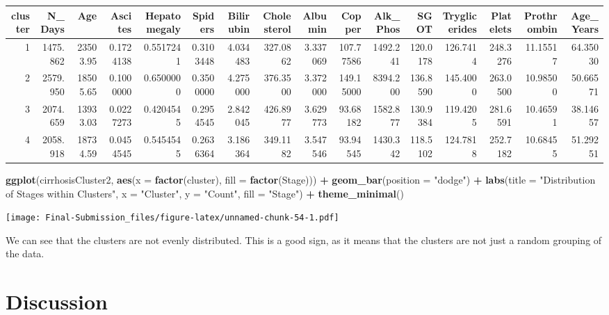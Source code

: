 \documentclass[
]{article}
\newenvironment{Shaded}{\begin{snugshade}}{\end{snugshade}}
\newcommand{\AttributeTok}[1]{\textcolor[rgb]{0.13,0.29,0.53}{#1}}
\newcommand{\FunctionTok}[1]{\textcolor[rgb]{0.13,0.29,0.53}{\textbf{#1}}}
\newcommand{\NormalTok}[1]{#1}
\newcommand{\SpecialCharTok}[1]{\textcolor[rgb]{0.81,0.36,0.00}{\textbf{#1}}}
\newcommand{\StringTok}[1]{\textcolor[rgb]{0.31,0.60,0.02}{#1}}
\begin{document}
\begin{tabular}{r|r|r|r|r|r|r|r|r|r|r|r|r|r|r|r}
\hline
cluster & N\_Days & Age & Ascites & Hepatomegaly & Spiders & Bilirubin & Cholesterol & Albumin & Copper & Alk\_Phos & SGOT & Tryglicerides & Platelets & Prothrombin & Age\_Years\\
\hline
1 & 1475.862 & 23503.95 & 0.1724138 & 0.5517241 & 0.3103448 & 4.034483 & 327.0862 & 3.337069 & 107.77586 & 1492.241 & 120.0178 & 126.7414 & 248.3276 & 11.15517 & 64.35030\\
\hline
2 & 2579.950 & 18505.65 & 0.1000000 & 0.6500000 & 0.3500000 & 4.275000 & 376.3500 & 3.372000 & 149.15000 & 8394.200 & 136.8590 & 145.4000 & 263.0500 & 10.98500 & 50.66571\\
\hline
3 & 2074.659 & 13933.03 & 0.0227273 & 0.4204545 & 0.2954545 & 2.842045 & 426.8977 & 3.629773 & 93.68182 & 1582.877 & 130.9384 & 119.4205 & 281.6591 & 10.46591 & 38.14657\\
\hline
4 & 2058.918 & 18734.59 & 0.0454545 & 0.5454545 & 0.2636364 & 3.186364 & 349.1182 & 3.547546 & 93.94545 & 1430.342 & 118.5102 & 124.7818 & 252.7182 & 10.68455 & 51.29251\\
\hline
\end{tabular}

\begin{Shaded}
\begin{Highlighting}[]
\FunctionTok{ggplot}\NormalTok{(cirrhosisCluster2, }\FunctionTok{aes}\NormalTok{(}\AttributeTok{x =} \FunctionTok{factor}\NormalTok{(cluster), }\AttributeTok{fill =} \FunctionTok{factor}\NormalTok{(Stage))) }\SpecialCharTok{+}
  \FunctionTok{geom\_bar}\NormalTok{(}\AttributeTok{position =} \StringTok{"dodge"}\NormalTok{) }\SpecialCharTok{+}
  \FunctionTok{labs}\NormalTok{(}\AttributeTok{title =} \StringTok{"Distribution of Stages within Clusters"}\NormalTok{,}
       \AttributeTok{x =} \StringTok{"Cluster"}\NormalTok{,}
       \AttributeTok{y =} \StringTok{"Count"}\NormalTok{,}
       \AttributeTok{fill =} \StringTok{"Stage"}\NormalTok{) }\SpecialCharTok{+}
  \FunctionTok{theme\_minimal}\NormalTok{()}
\end{Highlighting}
\end{Shaded}

\texttt{[image: Final-Submission\_files/figure-latex/unnamed-chunk-54-1.pdf]}

We can see that the clusters are not evenly distributed. This is a good
sign, as it means that the clusters are not just a random grouping of
the data.

\hypertarget{discussion}{%
\section{Discussion}\label{discussion}}
\end{document}
